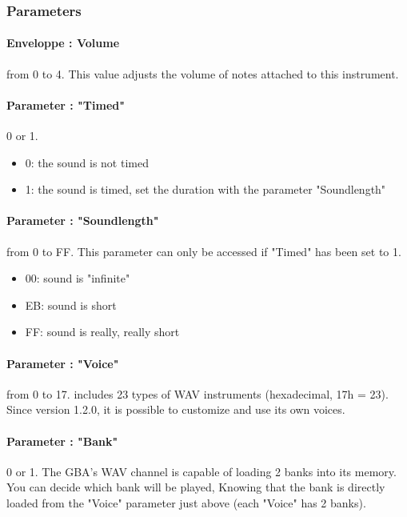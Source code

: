 
\subsubsection{Parameters}

\paragraph{Enveloppe : Volume} from 0 to 4.
This value adjusts the volume of notes attached to this instrument.

\paragraph{Parameter : "Timed"} 0 or 1.
\medskip

\begin{itemize}
    \item{0: the sound is not timed}
    \item{1: the sound is timed, set the duration with the parameter "Soundlength"}
\end{itemize}

\paragraph{Parameter : "Soundlength"} from 0 to FF.
This parameter can only be accessed if "Timed" has been set to 1.
\medskip

\begin{itemize}
    \item{00: sound is "infinite"}
    \item{EB: sound is short}
    \item{FF: sound is really, really short}
\end{itemize}

\paragraph{Parameter : "Voice"} from 0 to 17.
\FAT includes 23 types of WAV instruments (hexadecimal, 17h = 23).
Since version 1.2.0, it is possible to customize and use its own voices.

\paragraph{Parameter : "Bank"} 0 or 1.
The GBA's WAV channel is capable of loading 2 banks into its memory.
You can decide which bank will be played,
Knowing that the bank is directly loaded from the "Voice" parameter just above (each "Voice" has 2 banks).

